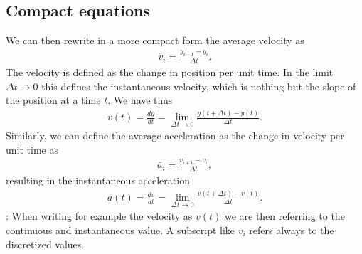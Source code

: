 \documentclass[letterpaper,10pt,english]{sphinxmanual}
\begin{document}
\subsection{Compact equations}
\label{\detokenize{chapter2:compact-equations}}
We can then rewrite in a more compact form the average velocity as
\begin{equation*}
\begin{split}
\overline{v}_i = \frac{y_{i+1}-y_{i}}{\Delta t}.
\end{split}
\end{equation*}
The velocity is defined as the change in position per unit time.
In the limit \(\Delta t \rightarrow 0\) this defines the instantaneous velocity, which is nothing but the slope of the position at a time \(t\).
We have thus
\begin{equation*}
\begin{split}
v(t) = \frac{dy}{dt}=\lim_{\Delta t \rightarrow 0}\frac{y(t+\Delta t)-y(t)}{\Delta t}.
\end{split}
\end{equation*}
Similarly, we can define the average acceleration as the change in velocity per unit time as
\begin{equation*}
\begin{split}
\overline{a}_i = \frac{v_{i+1}-v_{i}}{\Delta t},
\end{split}
\end{equation*}
resulting in the instantaneous acceleration
\begin{equation*}
\begin{split}
a(t) = \frac{dv}{dt}=\lim_{\Delta t\rightarrow 0}\frac{v(t+\Delta t)-v(t)}{\Delta t}.
\end{split}
\end{equation*}
: When writing for example the velocity as \(v(t)\) we are then referring to the continuous and instantaneous value. A subscript like
\(v_i\) refers always to the discretized values.
\end{document}
